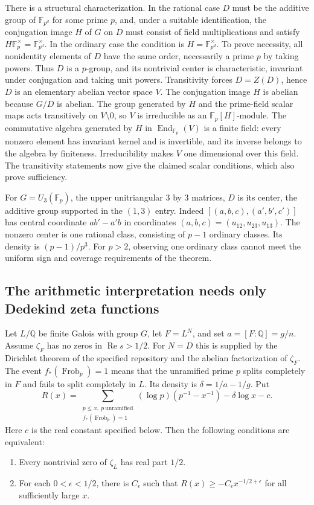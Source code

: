 There is a structural characterization. In the rational case $D$ must be
the additive group of $\mathbb F_{p^d}$ for some prime $p$, and, under
a suitable identification, the conjugation image $H$ of $G$ on $D$
must consist of field multiplications and satisfy
$H\mathbb F_p^\times=\mathbb F_{p^d}^{\times}$. In the ordinary case
the condition is $H=\mathbb F_{p^d}^{\times}$.
To prove necessity, all nonidentity elements of $D$ have the same
order, necessarily a prime $p$ by taking powers. Thus $D$ is a
$p$-group, and its nontrivial center is characteristic, invariant
under conjugation and taking unit powers. Transitivity forces
$D=Z(D)$, hence $D$ is an elementary abelian vector space $V$.
The conjugation image $H$ is abelian because $G/D$ is abelian.
The group generated by $H$ and the prime-field scalar maps acts
transitively on $V\setminus0$, so $V$ is irreducible as an
$\mathbb F_p[H]$-module. The commutative algebra generated by $H$
in $\operatorname{End}_{\mathbb F_p}(V)$ is a finite field: every
nonzero element has invariant kernel and is invertible, and its inverse
belongs to the algebra by finiteness. Irreducibility makes $V$ one
dimensional over this field. The transitivity statements now give the
claimed scalar conditions, which also prove sufficiency.

For $G=U_3(\mathbb F_p)$, the upper unitriangular $3$ by $3$ matrices,
$D$ is its center, the additive group supported in the $(1,3)$ entry.
Indeed $[(a,b,c),(a',b',c')]$ has central coordinate $ab'-a'b$ in
coordinates $(a,b,c)=(u_{12},u_{23},u_{13})$. The nonzero center is
one rational class, consisting of $p-1$ ordinary classes. Its density
is $(p-1)/p^3$. For $p>2$, observing one ordinary class cannot meet
the uniform sign and coverage requirements of the theorem.

\subsection*{The arithmetic interpretation needs only Dedekind zeta functions}
Let $L/\mathbb Q$ be finite Galois with group $G$, let $F=L^N$, and set
$a=[F:\mathbb Q]=g/n$. Assume $\zeta_F$ has no zeros in
$\operatorname{Re}s>1/2$. For $N=D$ this is supplied by the
Dirichlet theorem of the specified repository and the abelian
factorization of $\zeta_F$. The event $f_*(\operatorname{Frob}_p)=1$
means that the unramified prime $p$ splits completely in $F$ and fails
to split completely in $L$. Its density is $\delta=1/a-1/g$. Put
\[
  R(x)=\sum_{\substack{p\le x,\ p\ \mathrm{unramified}\\
                          f_*(\operatorname{Frob}_p)=1}}
       (\log p)(p^{-1}-x^{-1})-\delta\log x-c.
\]
Here $c$ is the real constant specified below. Then the following
conditions are equivalent:
\begin{enumerate}
\item Every nontrivial zero of $\zeta_L$ has real part $1/2$.
\item For each $0<\epsilon<1/2$, there is $C_\epsilon$ such that
$R(x)\ge-C_\epsilon x^{-1/2+\epsilon}$ for all sufficiently large $x$.
\end{enumerate}

